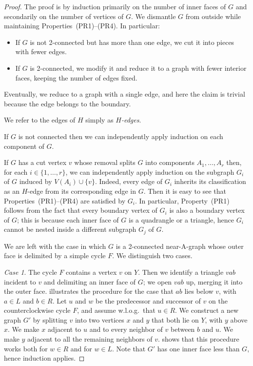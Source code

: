 \begin{proof}
	The proof is by induction primarily on the number of inner faces of $G$ and secondarily on the number of vertices of $G$. We dismantle $G$
	from outside while maintaining
	Properties~(PR1)--(PR4). In particular:
	\begin{itemize}
		\item If $G$ is not 2-connected but has more than one edge, we cut it
		into pieces with fewer edges.
		\item If $G$ is 2-connected, we modify it and reduce it to a
		graph
		with fewer interior faces,
		keeping the number of edges fixed.
	\end{itemize}
	Eventually, we reduce to a graph with a single edge, and here the
	claim is trivial because the edge belongs to the boundary.
	
	We refer to the edges of $H$ simply as \emph{$H$-edges}.
	
	If $G$ is not connected then we can independently apply induction on each component
	of $G$. 
	
	If $G$ has a cut vertex $v$ whose removal
	splits $G$ into components $A_1,\ldots,A_r$ then, for each
	$i\in\{1,\ldots,r\}$, we can independently apply induction on the subgraph $G_i$ of $G$
	induced by $V(A_i)\cup\{v\}$. Indeed, every edge of $G_i$ inherits its classification as an $H$-edge from its corresponding edge in $G$. Then it is easy to see that Properties~(PR1)--(PR4) are satisfied by $G_i$. In particular, Property~(PR1) follows from the fact that every boundary vertex of $G_i$ is also a boundary vertex of $G$; this is because each inner face of $G$ is a quadrangle or a triangle, hence $G_i$ cannot be nested inside a different subgraph $G_j$ of $G$.
		
	We are left with the case in which $G$ is a 2-connected near-A-graph whose outer face 
	is delimited by a simple cycle $F$. We distinguish two cases.
	
	{\em Case 1}. The cycle $F$ contains a vertex $v$ on $Y$. Then we identify a triangle $vab$ incident to $v$ and delimiting an inner face of $G$; we open $vab$ up, merging it into the outer face.  illustrates the procedure for the case that $ab$ lies below $v$, with $a\in L$ and $b\in R$. Let $u$ and $w$ be the predecessor and successor of $v$ on the
	counterclockwise cycle $F$, and assume w.l.o.g.\ that $u\in R$.
	We construct a new graph $G'$ by splitting $v$ into two vertices $x$
	and $y$ that both lie on $Y$, with $y$ above $x$. We make $x$ adjacent to $u$ and to every neighbor of $v$ between $b$ and $u$.
	We make $y$ adjacent to all the remaining neighbors of $v$.
	 shows that this procedure works both for $w\in R$
	and for $w\in L$. Note that $G'$ has one inner face less than $G$, hence induction applies.
		

\end{proof}
